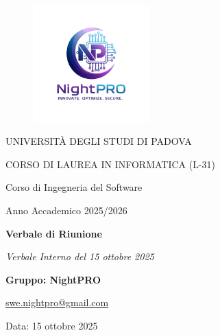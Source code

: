 \thispagestyle{empty}
\begin{titlepage}
    \centering
    
\begin{figure}
    \centering
    \includegraphics[width=0.4\textwidth]{logo.jpg}
\end{figure}

    \vfill
    
    {\small UNIVERSITÀ DEGLI STUDI DI PADOVA \par}
    {\small CORSO DI LAUREA IN INFORMATICA (L-31) \par}
    \vspace{0.5cm}
    {\large Corso di Ingegneria del Software \par}
    {\small Anno Accademico 2025/2026 \par}


    
    \vfill
    
    {\Huge \bfseries Verbale di Riunione \par}
    
    \vspace{1cm}
    
    {\Large \itshape Verbale Interno del 15 ottobre 2025 \par} 
    
    \vfill
    
    {\Large \bfseries Gruppo: NightPRO \par}
    \vspace{0.5cm}
    {\large \href{mailto:swe.nightpro@gmail.com}{swe.nightpro@gmail.com} \par}
    
    \vfill
    
    {\large Data: 15 ottobre 2025 \par}

\end{titlepage}

